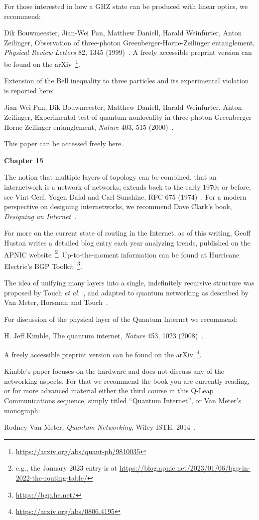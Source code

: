 For those interested in how a GHZ state can be produced with linear optics, we recommend:

Dik Bouwmeester, Jian-Wei Pan, Matthew Daniell, Harald Weinfurter, Anton Zeilinger, Observation of three-photon Greenberger-Horne-Zeilinger entanglement, \emph{Physical Review Letters} 82, 1345 (1999)~\cite{bouwmeester:ghz}.
A freely accessible preprint version can be found on the arXiv~\footnote{\url{https://arxiv.org/abs/quant-ph/9810035}}.

Extension of the Bell inequality to three particles and its experimental violation is reported here:

Jian-Wei Pan, Dik Bouwmeester, Matthew Daniell, Harald Weinfurter, Anton Zeilinger, Experimental test of quantum nonlocality in three-photon Greenberger-Horne-Zeilinger entanglement, \emph{Nature} 403, 515 (2000)~\cite{pan2000experimental}.

This paper can be accessed freely here.

{\bf Chapter 15}

The notion that multiple layers of topology can be combined, that an internetwork is a network of networks, extends back to the early 1970s or before; see Vint Cerf, Yogen Dalal and Carl Sunshine, RFC 675 (1974)~\cite{RFC0675}.  For a modern perspective on designing internetworks, we recommend Dave Clark's book, \emph{Designing an Internet}~\cite{clark2018designing}.

For more on the current state of routing in the Internet, as of this writing, Geoff Huston writes a detailed blog entry each year analyzing trends, published on the APNIC website~\footnote{e.g., the January 2023 entry is at \url{https://blog.apnic.net/2023/01/06/bgp-in-2022-the-routing-table/}}. Up-to-the-moment information can be found at Hurricane Electric's BGP Toolkit~\footnote{\url{https://bgp.he.net/}}.

The idea of unifying many layers into a single, indefinitely recursive structure was proposed by Touch \emph{et al.}~\cite{touch2006recursive}, and adapted to quantum networking as described by Van Meter, Horsman and Touch~\cite{van-meter11:rqrn}.

For discussion of the physical layer of the Quantum Internet we recommend:

H. Jeff Kimble, The quantum internet, \emph{Nature} 453, 1023 (2008)~\cite{kimble08:_quant_internet}.

A freely accessible preprint version can be found on the arXiv~\footnote{\url{https://arxiv.org/abs/0806.4195}}.

Kimble’s paper focuses on the hardware and does not discuss any of the networking aspects. For that we recommend the book you are currently reading, or for more advanced material either the third course in this Q-Leap Communications sequence, simply titled ``Quantum Internet'', or Van Meter’s monograph:

Rodney Van Meter, \emph{Quantum Networking}, Wiley-ISTE, 2014~\cite{van-meter14:_quantum_networking}.
